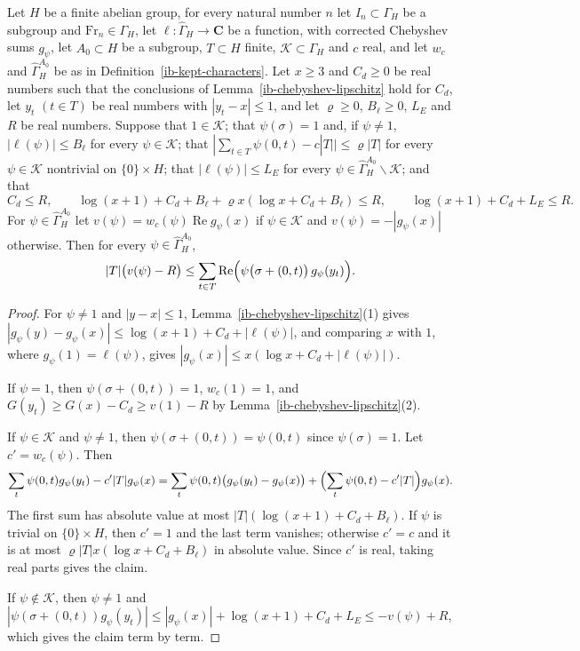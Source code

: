 \begin{lemma}\label{ib-kept-character-sum}
Let $H$ be a finite abelian group, for every natural number $n$ let
$I_n\subset\Gamma_H$ be a subgroup and $\mathrm{Fr}_n\in\Gamma_H$, let
$\ell:\widehat\Gamma_H\to\mathbf C$ be a function, with corrected Chebyshev sums $g_\psi$,
let $A_0\subset H$ be a subgroup, $T\subset H$ finite, $\mathcal K\subset\widehat\Gamma_H$
and $c$ real, and let $w_c$ and $\widehat\Gamma_H^{A_0}$ be as in
Definition~\ref{ib-kept-characters}. Let $x\geq3$ and $C_d\geq0$ be real numbers
such that the conclusions of Lemma~\ref{ib-chebyshev-lipschitz} hold for
$C_d$, let $y_t$ $(t\in T)$ be real numbers with $|y_t-x|\leq1$, and let
$\varrho\geq0$, $B_\ell\geq0$, $L_E$ and $R$ be real numbers. Suppose that
$1\in\mathcal K$; that $\psi(\sigma)=1$ and, if $\psi\neq1$,
$|\ell(\psi)|\leq B_\ell$ for every $\psi\in\mathcal K$; that
$|\sum_{t\in T}\psi(0,t)-c|T||\leq\varrho|T|$ for every $\psi\in\mathcal K$
nontrivial on $\{0\}\times H$; that $|\ell(\psi)|\leq L_E$ for every
$\psi\in\widehat\Gamma_H^{A_0}\smallsetminus\mathcal K$; and that
\[
 C_d\leq R,\qquad \log(x+1)+C_d+B_\ell+\varrho x(\log x+C_d+B_\ell)\leq R,\qquad
 \log(x+1)+C_d+L_E\leq R.
\]
For $\psi\in\widehat\Gamma_H^{A_0}$ let $v(\psi)=w_c(\psi)\operatorname{Re}g_\psi(x)$ if
$\psi\in\mathcal K$ and $v(\psi)=-|g_\psi(x)|$ otherwise. Then for every
$\psi\in\widehat\Gamma_H^{A_0}$,
\[
 |T|\bigl(v(\psi)-R\bigr)\leq\sum_{t\in T}\operatorname{Re}
 \Bigl(\psi\bigl(\sigma+(0,t)\bigr)\,g_\psi(y_t)\Bigr).
\]
\end{lemma}
\begin{proof}
For $\psi\neq1$ and $|y-x|\leq1$, Lemma~\ref{ib-chebyshev-lipschitz}(1) gives
$|g_\psi(y)-g_\psi(x)|\leq\log(x+1)+C_d+|\ell(\psi)|$, and comparing $x$ with
$1$, where $g_\psi(1)=\ell(\psi)$, gives $|g_\psi(x)|\leq x(\log x+C_d+|\ell(\psi)|)$.

If $\psi=1$, then $\psi(\sigma+(0,t))=1$, $w_c(1)=1$, and
$G(y_t)\geq G(x)-C_d\geq v(1)-R$ by Lemma~\ref{ib-chebyshev-lipschitz}(2).

If $\psi\in\mathcal K$ and $\psi\neq1$, then $\psi(\sigma+(0,t))=\psi(0,t)$ since
$\psi(\sigma)=1$. Let $c'=w_c(\psi)$. Then
\[
 \sum_t\psi(0,t)g_\psi(y_t)-c'|T|g_\psi(x)
 =\sum_t\psi(0,t)\bigl(g_\psi(y_t)-g_\psi(x)\bigr)
 +\Bigl(\sum_t\psi(0,t)-c'|T|\Bigr)g_\psi(x).
\]
The first sum has absolute value at most $|T|(\log(x+1)+C_d+B_\ell)$. If $\psi$ is
trivial on $\{0\}\times H$, then $c'=1$ and the last term vanishes; otherwise
$c'=c$ and it is at most $\varrho|T|x(\log x+C_d+B_\ell)$ in absolute value.
Since $c'$ is real, taking real parts gives the claim.

If $\psi\notin\mathcal K$, then $\psi\neq1$ and
$|\psi(\sigma+(0,t))g_\psi(y_t)|\leq|g_\psi(x)|+\log(x+1)+C_d+L_E
\leq-v(\psi)+R$, which gives the claim term by term.
\end{proof}

